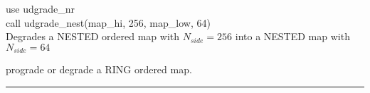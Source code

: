 \begin{example}
{
use udgrade\_nr \\
call udgrade\_nest(map\_hi, 256, map\_low, 64)  \\
}
{
Degrades a NESTED ordered map with $N_{side}=256$ into a NESTED map with $N_{side}=64$
}
\end{example}

\begin{related}
  \begin{sulist}{} %
  \item[\htmlref{udgrade\_ring}{sub:udgrade_ring}] prograde or degrade a RING
  ordered map.
  \end{sulist}
\end{related}

\rule{\hsize}{2mm}

\newpage
